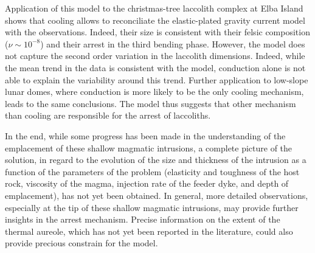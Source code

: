 Application of this  model to the christmas-tree  laccolith complex at
Elba   Island  shows   that   cooling  allows   to  reconciliate   the
elastic-plated gravity  current model  with the  observations. Indeed,
their   size    is   consistent   with   their    felsic   composition
($\nu  \sim   10^{-8}$)  and  their   arrest  in  the   third  bending
phase. However, the model does  not capture the second order variation
in the laccolith dimensions. Indeed, while  the mean trend in the data
is consistent with the model, conduction  alone is not able to explain
the variability  around this trend.  Further  application to low-slope
lunar domes,  where conduction is more  likely to be the  only cooling
mechanism, leads  to the  same conclusions.   The model  thus suggests
that other  mechanism than cooling  are responsible for the  arrest of
laccoliths.

In the end, while some progress  has been made in the understanding of
the  emplacement  of these  shallow  magmatic  intrusions, a  complete
picture of  the solution, in regard  to the evolution of  the size and
thickness of  the intrusion  as a  function of  the parameters  of the
problem (elasticity and  toughness of the host rock,  viscosity of the
magma, injection rate  of the feeder dyke, and  depth of emplacement),
has not  yet been obtained.   In general, more  detailed observations,
especially  at  the tip  of  these  shallow magmatic  intrusions,  may
provide further insights in the arrest mechanism.  Precise information
on the extent of the thermal  aureole, which has not yet been reported
in  the literature,  could  also provide  precious  constrain for  the
model.


